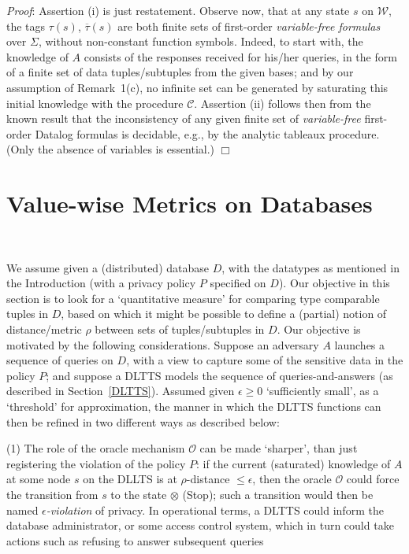 \documentclass[pdflatex]{article}
\def \C {{\mathcal{C}}}
\def \o {{\mathcal{O}}}
\def \W{{\mathcal{W}}}
\def \lft {\noindent}
\def \otau {\overline{\tau}}
\begin{document}
  \vspace*{-0.5mm}\lft
  {\em Proof}: Assertion (i) is just restatement. Observe now,  that at any state $s$ on
  $\W$,  the tags $\tau(s)$, $\otau(s)$ are both finite sets of first-order {\em variable-free
    formulas} over  $\Sigma$, without non-constant function symbols. Indeed,  to start
  with, the knowledge of $A$ consists of the  responses received for  his/her queries,
  in the form of a finite set of data tuples/subtuples  from the  given  bases; and 
  by our assumption of Remark~1(c), no infinite set can be generated by  saturating
  this  initial knowledge  with the procedure $\C$.  
  Assertion (ii) follows then  from the known result that the inconsistency of any given
  finite set of {\em variable-free} first-order Datalog formulas  is  decidable, e.g., by the 
analytic tableaux procedure.   (Only the absence of variables is essential.)  \hfill$\Box$ 

\vspace*{-1em}
 \section{ {\large Value-wise Metrics on Databases} }~\label{DataWise}
 \vspace*{-2em}
 
 We assume given a (distributed) database $D$, with the datatypes as mentioned
 in the Introduction (with a privacy policy $P$ specified on $D$). 
 Our objective in this section is to look for a `quantitative measure' for comparing 
 type comparable tuples in $D$, based on which it might be possible to define a 
 (partial) notion of distance/metric $\rho$ between sets of tuples/subtuples in  $D$. 
 Our objective is motivated by the following considerations. Suppose an adversary
 $A$ launches a sequence of queries on $D$, with a view to capture some of the
 sensitive data in the policy $P$; and suppose a DLTTS models the sequence
 of queries-and-answers (as described in Section~\ref{DLTTS}). Assumed  given
  $\epsilon \ge 0$ `sufficiently small', as  a `threshold' for approximation, the
 manner in which  the DLTTS functions can then be refined  in two  different ways 
as described below:  

 (1) The role of the oracle  mechanism $\o$ can be made `sharper',  than just 
 registering the violation of the policy $P$: if the current (saturated) knowledge
 of $A$ at some node $s$ on the   DLLTS is  at $\rho$-distance $\le  \epsilon$, then
 the  oracle  $\o$ could force the transition  from $s$ to the state $\otimes$ (Stop);
 such a transition would then be named {\em $\epsilon$-violation} of privacy.
 {In operational terms, a DLTTS could inform the database administrator,
   or some access control system, which in turn could take actions such as refusing
   to answer subsequent queries} 
   
\end{document}
